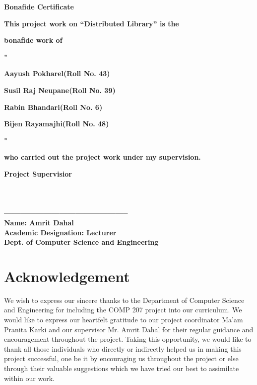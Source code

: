 \documentclass[12pt]{article}
\begin{document}
\clearpage
\thispagestyle{empty}
\vspace*{10mm}
\centerline{\textbf{\Large{Bonafide Certificate}}}
\vspace*{30mm}
\centerline{\textbf{This project work on “Distributed Library” is the}} 
\vspace*{2mm}
\centerline{\textbf{bonafide work of}}
\vspace*{2mm}
\centerline{\textbf{"}}
\centerline{\textbf{Aayush Pokharel(Roll No. 43)}}
\centerline{\textbf{Susil Raj Neupane(Roll No. 39)}}
\centerline{\textbf{Rabin Bhandari(Roll No. 6)}}
\centerline{\textbf{Bijen Rayamajhi(Roll No. 48)}}
\centerline{\textbf{"}}
\vspace*{2mm}
\centerline{\textbf{who carried out the project work under my supervision.}}
\vspace*{80mm}
\textbf{Project Supervisior}
\\\\
\\\\
\textbf{-----------------------------------------------}
\vspace*{2mm}
\\
\textbf{Name: Amrit Dahal}
\vspace*{2mm}\\
\textbf{Academic Designation: Lecturer}
\vspace*{2mm}\\
\textbf{Dept. of Computer Science and Engineering}

\clearpage
{}


\section{Acknowledgement}
\vspace*{5mm}

We wish to express our sincere thanks to the Department of Computer Science and 
Engineering for including the COMP 207 project into our curriculum. We would 
like to express our heartfelt gratitude to our project coordinator 
Ma’am Pranita Karki and our supervisor Mr. Amrit Dahal for their regular 
guidance and encouragement throughout the project. Taking this opportunity, we would 
like to thank all those individuals who directly or indirectly helped us in making 
this project successful, one be it by encouraging us throughout the project or 
else through their valuable suggestions which we have tried our best to assimilate 
within our work.
\end{document}
